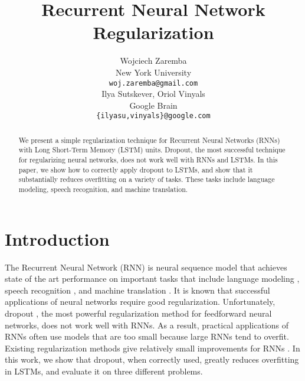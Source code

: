 \documentclass{article}
\title{Recurrent Neural Network Regularization}
\begin{document}
 



\author{
Wojciech Zaremba \\
New York University\\
\texttt{woj.zaremba@gmail.com} \\
\And
Ilya Sutskever, Oriol Vinyals \\
Google Brain \\
\texttt{\{ilyasu,vinyals\}@google.com} \\
}

\maketitle






\begin{abstract} 
  We present a simple regularization technique for Recurrent Neural
  Networks (RNNs) with Long Short-Term Memory (LSTM) units.  Dropout,
  the most successful technique for regularizing neural networks, does
  not work well with RNNs and LSTMs.  In this paper, we show how to
  correctly apply dropout to LSTMs, and show that it
  substantially reduces overfitting on a variety of tasks. These tasks
  include language modeling, speech recognition, and machine
  translation.
\end{abstract} 

\section{Introduction}

The Recurrent Neural Network (RNN) is neural sequence model that achieves state of the art
performance on important tasks that include language modeling
\cite{mikolov2012statistical}, speech recognition
\cite{graves2013speech}, and machine translation
\cite{kal13}.  It is known that successful applications of
neural networks require good regularization. Unfortunately, dropout
\cite{srivastava2013improving}, the most powerful regularization method
for feedforward neural networks, does not work well with
RNNs. As a result, practical applications of RNNs often
use models that are too small because large RNNs tend to overfit.  
Existing regularization methods give relatively small improvements for
RNNs \cite{graves2013generating}.
In this work, we show that dropout, when correctly used,
greatly reduces overfitting in LSTMs, and evaluate it on three different problems.
\end{document}
